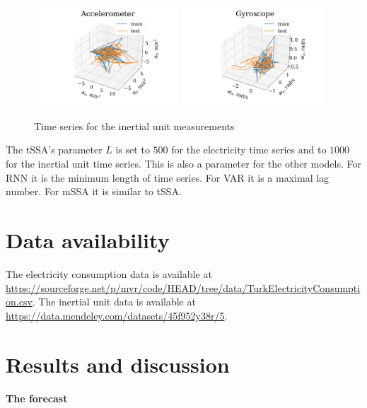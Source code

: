 \documentclass[referee, pdflatex, sn-mathphys-num]{sn-jnl}
\theoremstyle{definition}
\theoremstyle{plain}
\begin{document}
	\begin{figure}[!htbp]
		\centering
		\includegraphics[width=0.48\textwidth, keepaspectratio]{acceleromter_example.png}
		\includegraphics[width=0.48\textwidth, keepaspectratio]{gyro_example.png}
		\caption{Time series for the inertial unit measurements}\label{fig:motion_data}
	\end{figure}
	
	The tSSA's parameter $ L $ is set to $ 500 $ for the electricity time series and to $ 1000 $ for the inertial unit time series. This is also a parameter for the other models. For RNN it is the minimum length of time series. For VAR it is a maximal lag number. For mSSA it is similar to tSSA.
	
	\section{Data availability}
	
	The electricity consumption data is available at \url{https://sourceforge.net/p/mvr/code/HEAD/tree/data/TurkElectricityConsumption.csv}. The inertial unit data is available at \url{https://data.mendeley.com/datasets/45f952y38r/5}.
	
	\section{Results and discussion}
	
	\paragraph{The forecast}
	
\end{document}
